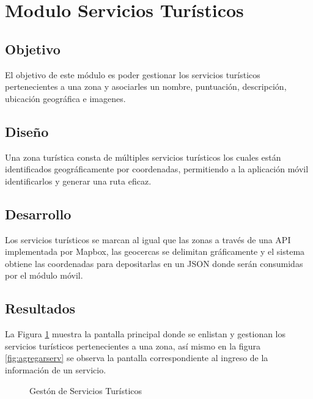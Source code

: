\section{Modulo Servicios Turísticos}

\subsection{Objetivo}
El objetivo de este módulo es poder gestionar los servicios turísticos pertenecientes a una zona y asociarles un nombre, puntuación, descripción, ubicación geográfica e imagenes.

\subsection{Diseño}

Una zona turística consta de múltiples servicios turísticos los cuales están identificados geográficamente por coordenadas, permitiendo a la aplicación móvil identificarlos y generar una ruta eficaz.


\subsection{Desarrollo}

Los servicios turísticos se marcan al igual que las zonas a través de una API implementada por Mapbox, las geocercas se delimitan gráficamente y el sistema obtiene las coordenadas para depositarlas en un JSON donde serán consumidas por el módulo móvil.

\subsection{Resultados}

La Figura \ref{fig:servicios} muestra la pantalla principal donde se enlistan y gestionan  los servicios turísticos pertenecientes a una zona, así mismo en la figura \ref{fig:agregarserv} se observa la pantalla correspondiente al ingreso de la información de un servicio.\\

\begin{figure}[htbp]
	\begin{center}
		\caption{Gestón de Servicios Turísticos}
		\label{fig:servicios}
	\end{center}
\end{figure}

